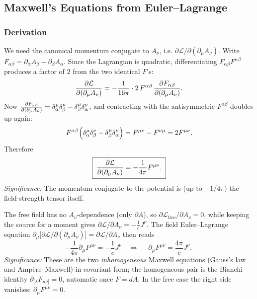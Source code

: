 \subsection{Maxwell's Equations from Euler--Lagrange}
\label{subsec:lec23:maxwell-from-EL}

\subsubsection*{Derivation}
We need the canonical momentum conjugate to $A_\nu$, i.e.
$\partial\mathcal L/\partial(\partial_\mu A_\nu)$. Write
$F_{\alpha\beta}=\partial_\alpha A_\beta-\partial_\beta A_\alpha$. Since the Lagrangian is
quadratic, differentiating $F_{\alpha\beta}F^{\alpha\beta}$ produces a factor of $2$ from
the two identical $F$'s:
\begin{equation}\label{eq:lec23:dL-step1}
  \pdv{\mathcal L}{(\partial_\mu A_\nu)}
  =-\frac{1}{16\pi}\cdot 2\,F^{\alpha\beta}\,
   \pdv{F_{\alpha\beta}}{(\partial_\mu A_\nu)} .
\end{equation}
Now
$\pdv{F_{\alpha\beta}}{(\partial_\mu A_\nu)}
 =\delta^\mu_\alpha\delta^\nu_\beta-\delta^\mu_\beta\delta^\nu_\alpha$,
and contracting with the antisymmetric $F^{\alpha\beta}$ doubles up again:
\begin{equation}\label{eq:lec23:dL-step2}
  F^{\alpha\beta}\qty(\delta^\mu_\alpha\delta^\nu_\beta-\delta^\mu_\beta\delta^\nu_\alpha)
  =F^{\mu\nu}-F^{\nu\mu}=2F^{\mu\nu}.
\end{equation}
Therefore
\begin{equation}\label{eq:lec23:conjugate-momentum}
  \boxed{\;\pdv{\mathcal L}{(\partial_\mu A_\nu)}=-\frac{1}{4\pi}F^{\mu\nu}.\;}
\end{equation}
\textit{Significance:} The momentum conjugate to the potential is (up to $-1/4\pi$) the
field-strength tensor itself.

The free field has no $A_\nu$-dependence (only $\partial A$), so
$\partial\mathcal L_{\text{free}}/\partial A_\nu=0$, while keeping the source for a moment
gives $\partial\mathcal L/\partial A_\nu=-\tfrac1c J^\nu$. The field Euler--Lagrange
equation $\partial_\mu\big[\partial\mathcal L/\partial(\partial_\mu A_\nu)\big]
=\partial\mathcal L/\partial A_\nu$ then reads
\begin{equation}\label{eq:lec23:maxwell}
  -\frac{1}{4\pi}\partial_\mu F^{\mu\nu}=-\frac1c J^\nu
  \quad\Longrightarrow\quad
  \boxed{\;\partial_\mu F^{\mu\nu}=\frac{4\pi}{c}J^\nu .\;}
\end{equation}
\textit{Significance:} These are the two \emph{inhomogeneous} Maxwell equations (Gauss's law
and Amp\`ere--Maxwell) in covariant form; the homogeneous pair is the Bianchi identity
$\partial_{[\lambda}F_{\mu\nu]}=0$, automatic once $F=dA$. In the free case the right side
vanishes: $\partial_\mu F^{\mu\nu}=0$.

